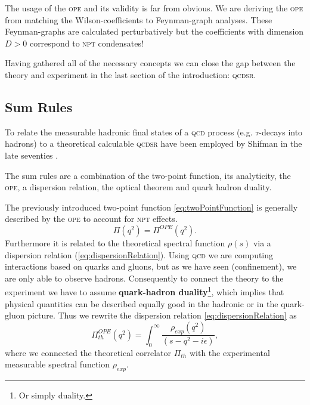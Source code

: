 \documentclass[../../index.tex]{subfiles}
\begin{document}
The usage of the \textsc{ope} and its validity is far from obvious. We are
deriving the \textsc{ope} from matching the Wilson-coefficients to Feynman-graph
analyses. These Feynman-graphs are calculated perturbatively but the
coefficients with dimension $D>0$ correspond to \textsc{npt} condensates!

Having gathered all of the necessary concepts we can close the gap between the
theory and experiment in the last section of the introduction: \textsc{qcdsr}.


\subsection{Sum Rules}
\label{sec:sumRules}
To relate the measurable hadronic final states of a \textsc{qcd} process (e.g.
$\tau$-decays into hadrons) to a theoretical calculable \textsc{qcdsr} have been
employed by Shifman in the late seventies \cite{Shifman1978}.

The sum rules are a combination of the two-point function, its analyticity, the
\textsc{ope}, a dispersion relation, the optical theorem and quark hadron
duality.

The previously introduced two-point function \cref{eq:twoPointFunction} is
generally described by the \textsc{ope} to account for \textsc{npt} effects.
\begin{equation}
  \Pi(q^2) = \Pi^{OPE}(q^2).
\end{equation}
Furthermore it is related to the theoretical spectral function $\rho(s)$ via a
dispersion relation (\cref{eq:dispersionRelation}). Using \textsc{qcd} we are
computing interactions based on quarks and gluons, but as we have seen
(confinement), we are only able to observe hadrons. Consequently to connect the
theory to the experiment we have to assume \textbf{quark-hadron
  duality}\footnote{Or simply duality.}, which implies that physical quantities
can be described equally good in the hadronic or in the quark-gluon picture.
Thus we rewrite the dispersion relation \cref{eq:dispersionRelation} as
\begin{equation}
  \Pi^{OPE}_{th}(q^2) = \int_0^\infty \frac{\rho_{exp}(q^2)}{(s-q^2-i\epsilon)},
\end{equation}
where we connected the theoretical correlator $\Pi_{th}$ with the experimental
measurable spectral function $\rho_{exp}$.
\end{document}
